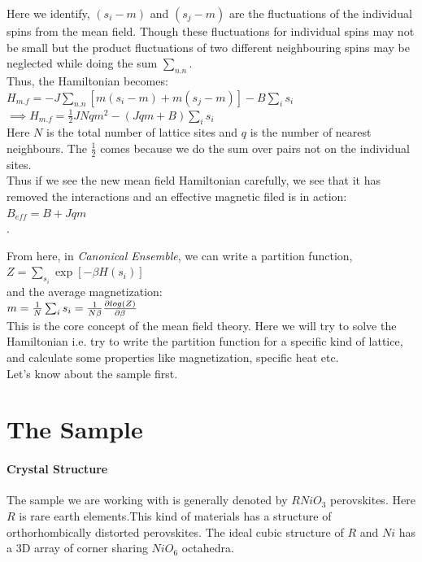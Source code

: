 \documentclass[20pt]{article}
\begin{document}
Here we identify, $(s_i - m)$ and $(s_j - m)$ are the fluctuations of the individual spins from the mean field. Though these fluctuations for individual spins may not be small but the product fluctuations of two different neighbouring spins  may be neglected while doing the sum $\sum_{n.n}$.\\
Thus, the Hamiltonian becomes:\\

$H_{m.f} = -J \sum_{n.n} [m (s_i - m) + m (s_j - m)] - B \sum_{i} s_i$\\

$\implies H_{m.f} = \frac{1}{2} J N q m^2 - (J q m + B)\sum_{i} s_i $ \\

Here $N$ is the total number of lattice sites and $q$ is the number of nearest neighbours. The $\frac{1}{2}$ comes because we do the sum over pairs not on the individual sites.\\
Thus if we see the new mean field Hamiltonian carefully, we see that it has removed the interactions and an effective magnetic filed is in action:\\

$B_{eff} = B + J q m$\\. 

From here, in \textit{Canonical Ensemble}, we can write a partition function,\\

$Z= \sum_{s_i} \exp[-\beta H(s_i)]$\\
 
and the average magnetization:\\
 
$m= \frac{1}{N} \sum_{i} s_i = \frac{1}{N \beta} \pdv {log(Z)}{\beta}$\\
  

This is the core concept of the mean field theory. Here we will try to solve the Hamiltonian i.e. try to write the partition function for a specific kind of lattice, and calculate some properties like magnetization, specific heat etc.\\
Let's know about the sample first.\\

\section*{The Sample}
\paragraph{ Crystal Structure\\}
The sample we are working with is generally denoted by $RNiO_3$ perovskites. Here $R$ is rare earth elements.This kind of materials has a structure of orthorhombically distorted perovskites. The ideal cubic structure of $R$ and $Ni$ has a 3D array of  corner sharing $Ni O_6$ octahedra.
\end{document}
